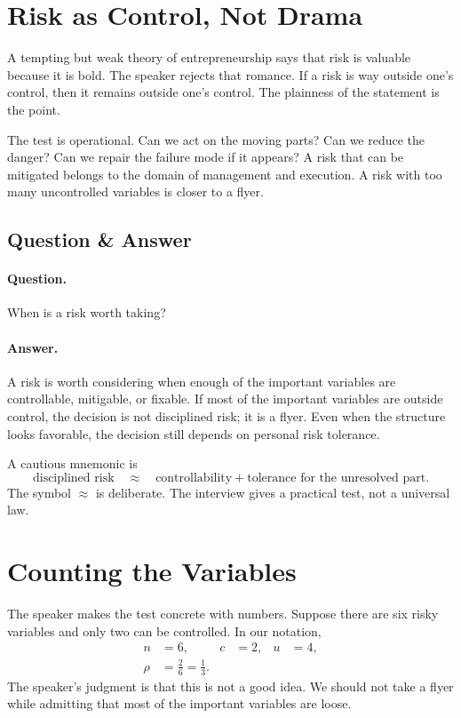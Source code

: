 \section{Risk as Control, Not Drama}

A tempting but weak theory of entrepreneurship says that risk is valuable because it is bold. The speaker rejects that romance. If a risk is way outside one's control, then it remains outside one's control. The plainness of the statement is the point.

The test is operational. Can we act on the moving parts? Can we reduce the danger? Can we repair the failure mode if it appears? A risk that can be mitigated belongs to the domain of management and execution. A risk with too many uncontrolled variables is closer to a flyer.

\subsection{Question \& Answer}

\paragraph{Question.}
When is a risk worth taking?

\paragraph{Answer.}
A risk is worth considering when enough of the important variables are controllable, mitigable, or fixable. If most of the important variables are outside control, the decision is not disciplined risk; it is a flyer. Even when the structure looks favorable, the decision still depends on personal risk tolerance.

A cautious mnemonic is
\begin{equation}
\text{disciplined risk}
\quad \approx \quad
\text{controllability}
+
\text{tolerance for the unresolved part}.
\end{equation}
The symbol \(\approx\) is deliberate. The interview gives a practical test, not a universal law.

\section{Counting the Variables}

The speaker makes the test concrete with numbers. Suppose there are six risky variables and only two can be controlled. In our notation,
\begin{align}
n&=6, & c&=2, & u&=4,\\
\rho&=\frac{2}{6}=\frac{1}{3}.
\end{align}
The speaker's judgment is that this is not a good idea. We should not take a flyer while admitting that most of the important variables are loose.

